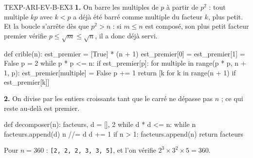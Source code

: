 \begin{corrige}{TEXP-ARI-EV-B-EX3}
\textbf{1.} On barre les multiples de $p$ à partir de $p^2$ : tout multiple $kp$ avec $k<p$ a déjà été barré comme multiple du facteur $k$, plus petit. Et la boucle s'arrête dès que $p^2>n$ : si $m\leq n$ est composé, son plus petit facteur premier vérifie $p\leq\sqrt m\leq\sqrt n$, il a donc déjà servi.

\begin{python}
def crible(n):
    est_premier = [True] * (n + 1)
    est_premier[0] = est_premier[1] = False
    p = 2
    while p * p <= n:
        if est_premier[p]:
            for multiple in range(p * p, n + 1, p):
                est_premier[multiple] = False
        p += 1
    return [k for k in range(n + 1) if est_premier[k]]
\end{python}

\textbf{2.} On divise par les entiers croissants tant que le carré ne dépasse pas $n$ ; ce qui reste au-delà est premier.

\begin{python}
def decomposer(n):
    facteurs, d = [], 2
    while d * d <= n:
        while n %
            facteurs.append(d)
            n //= d
        d += 1
    if n > 1:
        facteurs.append(n)
    return facteurs
\end{python}

Pour $n=360$ : \texttt{[2, 2, 2, 3, 3, 5]}, et l'on vérifie $2^3\times3^2\times5=360$.
\end{corrige}
